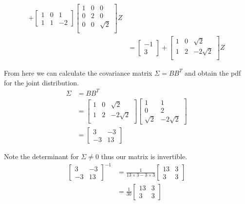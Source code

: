 \documentclass{article}
\begin{document}
\begin{align*}
    +
    \begin{bmatrix} 1 & 0 & 1 \\ 1 & 1 & -2 \end{bmatrix}
    \begin{bmatrix}
        1 & 0 & 0 \\
        0 & 2 & 0 \\
        0 & 0 & \sqrt{2} \\
    \end{bmatrix}
    Z  \\
    &= \begin{bmatrix} -1 \\ 3 \end{bmatrix}
    +
    \begin{bmatrix}
        1 & 0 & \sqrt{2} \\
        1 & 2 & -2\sqrt{2} \\
    \end{bmatrix}
    Z
\end{align*}

From here we can calculate the covariance matrix $\Sigma = BB^T$ and obtain
the pdf for the joint distribution.
\begin{align*}
    \Sigma &= BB^T \\
    &=
    \begin{bmatrix}
        1 & 0 & \sqrt{2} \\
        1 & 2 & -2\sqrt{2} \\
    \end{bmatrix}
    \begin{bmatrix}
        1 & 1 \\
        0 & 2 \\
        \sqrt{2} & -2\sqrt{2}
    \end{bmatrix} \\
    &=
    \begin{bmatrix}
        3 & -3 \\
        -3 & 13
    \end{bmatrix}
\end{align*}

Note the determinant for $\Sigma \neq 0$ thus our matrix is invertible.
\begin{align*}
    \begin{bmatrix}
        3 & -3 \\
        -3 & 13
    \end{bmatrix}^{-1}
    &= \frac{1}{13 \times 3 - 3 \times 3}
    \begin{bmatrix}
        13 & 3 \\
        3 & 3
    \end{bmatrix} \\
    &= \frac{1}{30}
    \begin{bmatrix}
        13 & 3 \\
        3 & 3
    \end{bmatrix} \\
\end{align*}
\end{document}
